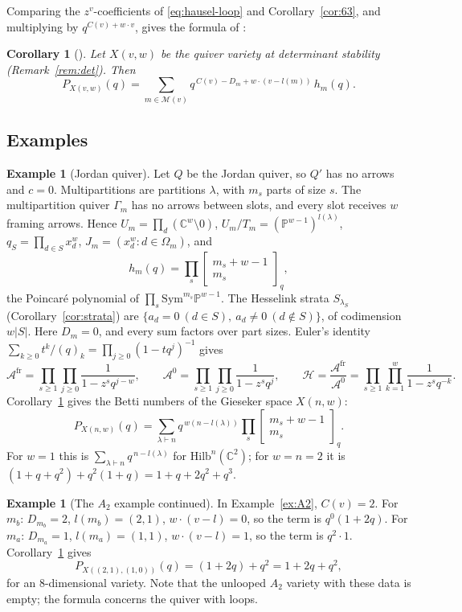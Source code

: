 \documentclass[11pt]{amsart}
\newtheorem{corollary}[theorem]{Corollary}
\theoremstyle{definition}
\newtheorem{example}[theorem]{Example}
\theoremstyle{remark}
\numberwithin{equation}{section}
\newcommand{\C}{\mathbb{C}}
\newcommand{\cM}{\mathcal{M}}
\newcommand{\cH}{\mathcal{H}}
\newcommand{\Afr}{\mathcal{A}^{\mathrm{fr}}}
\newcommand{\Aun}{\mathcal{A}^{0}}
\newcommand{\Om}{\Omega_m}
\newcommand{\gbin}[2]{\begin{bmatrix} #1 \\ #2 \end{bmatrix}_q}
\begin{document}
Comparing the $z^v$-coefficients of \eqref{eq:hausel-loop} and Corollary~\ref{cor:63}, and multiplying by
$q^{C(v)+w\cdot v}$, gives the formula of \cite[(6.8)]{Hik}:

\begin{corollary}[{\cite[Proposition~6.4]{Hik}}]\label{cor:68}
Let $X(v,w)$ be the quiver variety at determinant stability (Remark~\ref{rem:det}). Then
\[
  P_{X(v,w)}(q)=\sum_{m\in\cM(v)}q^{\,C(v)-D_m+w\cdot(v-l(m))}\,h_m(q).
\]
\end{corollary}

\subsection{Examples}

\begin{example}[Jordan quiver]
Let $Q$ be the Jordan quiver, so $Q'$ has no arrows and $c=0$. Multipartitions are partitions $\lambda$,
with $m_s$ parts of size $s$. The multipartition quiver $\Gamma_m$ has no arrows between slots, and every
slot receives $w$ framing arrows. Hence $U_m=\prod_d(\C^w\setminus0)$, $U_m/T_m=(\mathbb P^{w-1})^{l(\lambda)}$,
$q_S=\prod_{d\in S}x_d^w$, $J_m=(x_d^w:d\in\Om)$, and
\[
  h_m(q)=\prod_s\gbin{m_s+w-1}{m_s},
\]
the Poincar\'e polynomial of $\prod_s\mathrm{Sym}^{m_s}\mathbb P^{w-1}$. The Hesselink strata
$S_{\lambda_S}$ (Corollary~\ref{cor:strata}) are $\{a_d=0\ (d\in S),\ a_d\neq0\ (d\notin S)\}$, of
codimension $w|S|$. Here $D_m=0$, and every sum
factors over part sizes. Euler's identity $\sum_{k\ge0}t^k/(q)_k=\prod_{j\ge0}(1-tq^j)^{-1}$ gives
\[
  \Afr=\prod_{s\ge1}\prod_{j\ge0}\frac1{1-z^sq^{j-w}},\qquad
  \Aun=\prod_{s\ge1}\prod_{j\ge0}\frac1{1-z^sq^{j}},\qquad
  \cH=\frac{\Afr}{\Aun}=\prod_{s\ge1}\prod_{k=1}^{w}\frac1{1-z^sq^{-k}} .
\]
Corollary~\ref{cor:68} gives the Betti numbers of the Gieseker space $X(n,w)$:
\[
  P_{X(n,w)}(q)=\sum_{\lambda\vdash n}q^{\,w(n-l(\lambda))}\prod_s\gbin{m_s+w-1}{m_s}.
\]
For $w=1$ this is $\sum_{\lambda\vdash n}q^{\,n-l(\lambda)}$ for $\mathrm{Hilb}^n(\C^2)$; for $w=n=2$ it
is $(1+q+q^2)+q^2(1+q)=1+q+2q^2+q^3$.
\end{example}

\begin{example}[The $A_2$ example continued]
In Example~\ref{ex:A2}, $C(v)=2$. For $m_b$: $D_{m_b}=2$, $l(m_b)=(2,1)$, $w\cdot(v-l)=0$, so the term is
$q^0(1+2q)$. For $m_a$: $D_{m_a}=1$, $l(m_a)=(1,1)$, $w\cdot(v-l)=1$, so the term is $q^{2}\cdot1$.
Corollary~\ref{cor:68} gives
\[
  P_{X((2,1),(1,0))}(q)=(1+2q)+q^2=1+2q+q^2,
\]
for an $8$-dimensional variety. Note that the unlooped $A_2$ variety with these data is empty; the
formula concerns the quiver with loops.
\end{example}
\end{document}
